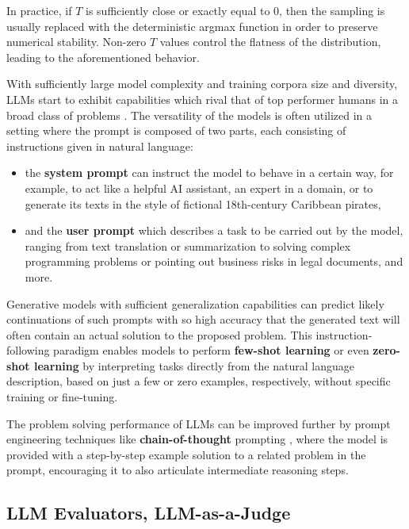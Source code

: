 \documentclass[noindent,nohyp,parspace,titlepage,twoside,12pt]{article}
\begin{document}
      In practice, if $T$ is sufficiently close or exactly equal to $0$, then
      the sampling is usually replaced with the deterministic argmax function
      in order to preserve numerical stability. Non-zero $T$ values control
      the flatness of the distribution, leading to the aforementioned behavior.

      With sufficiently large model complexity and training corpora size and
      diversity, LLMs start to exhibit capabilities which rival that of top
      performer humans in a broad class of problems \cite{gpt3,gpt4}. The
      versatility of the models is often utilized in a setting where the prompt
      is composed of two parts, each consisting of instructions given in
      natural language:

      \begin{itemize}
        \item the \textbf{system prompt} can instruct the model to behave in a
              certain way, for example, to act like a helpful AI assistant,
              an expert in a domain, or to generate its texts in the style of
              fictional 18th-century Caribbean pirates,

        \item and the \textbf{user prompt} which describes a task to be carried
              out by the model, ranging from text translation or summarization
              to solving complex programming problems or pointing out business
              risks in legal documents, and more.
      \end{itemize}

      Generative models with sufficient generalization capabilities can predict
      likely continuations of such prompts with so high accuracy that the
      generated text will often contain an actual solution to the proposed
      problem. This instruction-following paradigm enables models to perform
      \textbf{few-shot learning} \cite{gpt3} or even \textbf{zero-shot learning}
      by interpreting tasks directly from the natural language description,
      based on just a few or zero examples, respectively, without specific
      training or fine-tuning.

      The problem solving performance of LLMs can be improved further by
      prompt engineering techniques like \textbf{chain-of-thought} prompting
      \cite{cot}, where the model is provided with a step-by-step example
      solution to a related problem in the prompt, encouraging it to also
      articulate intermediate reasoning steps.

    \subsection{LLM Evaluators, LLM-as-a-Judge}

\newpage

  \nocite{*}
  \printbibliography[heading=bibintoc]
\end{document}
